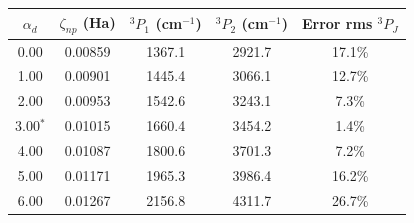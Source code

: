 \begin{tabular}{ccccc}
    \toprule
    $\alpha_d$ & $\zeta_{np}$ (Ha) & $^3P_1$ (cm$^{-1}$) & $^3P_2$ (cm$^{-1}$) & Error rms $^3P_J$ \\
    \midrule
    0.00 & 0.00859 & 1367.1 & 2921.7 & 17.1\% \\
    1.00 & 0.00901 & 1445.4 & 3066.1 & 12.7\% \\
    2.00 & 0.00953 & 1542.6 & 3243.1 & 7.3\% \\
    3.00$^{*}$ & 0.01015 & 1660.4 & 3454.2 & 1.4\% \\
    4.00 & 0.01087 & 1800.6 & 3701.3 & 7.2\% \\
    5.00 & 0.01171 & 1965.3 & 3986.4 & 16.2\% \\
    6.00 & 0.01267 & 2156.8 & 4311.7 & 26.7\% \\
    \bottomrule
\end{tabular}
